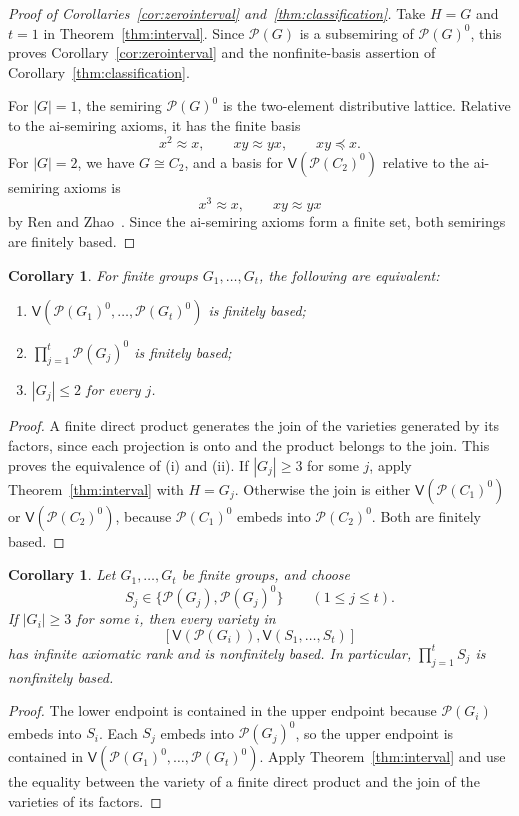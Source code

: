 \documentclass[10pt,a4paper]{amsart}
\newtheorem{corollary}[theorem]{Corollary}
\numberwithin{equation}{section}
\newcommand{\Pow}{\mathcal{P}}
\newcommand{\Full}[1]{\mathcal{P}(#1)^0}
\newcommand{\Var}{\mathsf{V}}
\renewcommand{\leq}{\leqslant}
\renewcommand{\geq}{\geqslant}
\begin{document}
\begin{proof}[Proof of Corollaries~\ref{cor:zerointerval} and~\ref{thm:classification}]
Take $H=G$ and $t=1$ in Theorem~\ref{thm:interval}. Since $\Pow(G)$ is a subsemiring of $\Full{G}$, this proves Corollary~\ref{cor:zerointerval} and the nonfinite-basis assertion of Corollary~\ref{thm:classification}.

For $|G|=1$, the semiring $\Full{G}$ is the two-element distributive lattice. Relative to the ai-semiring axioms, it has the finite basis
\[
 x^2\approx x,\qquad xy\approx yx,\qquad xy\preceq x.
\]
For $|G|=2$, we have $G\cong C_2$, and a basis for $\Var(\Full{C_2})$ relative to the ai-semiring axioms is
\begin{equation}\label{eq:C2basis}
 x^3\approx x,\qquad xy\approx yx
\end{equation}
by Ren and Zhao~\cite[Lemma~3.7]{rz}. Since the ai-semiring axioms form a finite set, both semirings are finitely based.
\end{proof}

\begin{corollary}\label{cor:finitejoins}
For finite groups $G_1,\ldots,G_t$, the following are equivalent:
\begin{enumerate}[label=\textup{(\roman*)},leftmargin=2.4em]
\item $\Var(\Full{G_1},\ldots,\Full{G_t})$ is finitely based;
\item $\prod_{j=1}^{t}\Full{G_j}$ is finitely based;
\item $|G_j|\leq 2$ for every $j$.
\end{enumerate}
\end{corollary}
\begin{proof}
A finite direct product generates the join of the varieties generated by its factors, since each projection is onto and the product belongs to the join. This proves the equivalence of (i) and (ii). If $|G_j|\geq 3$ for some $j$, apply Theorem~\ref{thm:interval} with $H=G_j$. Otherwise the join is either $\Var(\Full{C_1})$ or $\Var(\Full{C_2})$, because $\Full{C_1}$ embeds into $\Full{C_2}$. Both are finitely based.
\end{proof}

\begin{corollary}\label{cor:mixed}
Let $G_1,\ldots,G_t$ be finite groups, and choose
\[
 S_j\in\{\Pow(G_j),\Full{G_j}\}\qquad(1\leq j\leq t).
\]
If $|G_i|\geq 3$ for some $i$, then every variety in
\[
 [\Var(\Pow(G_i)),\Var(S_1,\ldots,S_t)]
\]
has infinite axiomatic rank and is nonfinitely based. In particular, $\prod_{j=1}^{t}S_j$ is nonfinitely based.
\end{corollary}
\begin{proof}
The lower endpoint is contained in the upper endpoint because $\Pow(G_i)$ embeds into $S_i$. Each $S_j$ embeds into $\Full{G_j}$, so the upper endpoint is contained in $\Var(\Full{G_1},\ldots,\Full{G_t})$. Apply Theorem~\ref{thm:interval} and use the equality between the variety of a finite direct product and the join of the varieties of its factors.
\end{proof}
\end{document}
